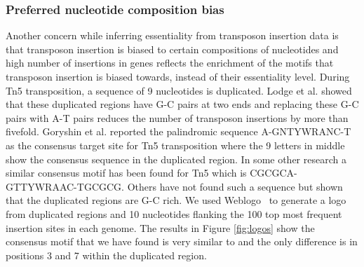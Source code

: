\documentclass[12pt,letterpaper]{article}
\begin{document}
\subsubsection{Preferred nucleotide composition bias}
Another concern while inferring essentiality from transposon insertion data is that transposon insertion is biased to certain compositions of nucleotides and high number of insertions in genes reflects the enrichment of the motifs that transposon insertion is biased towards, instead of their essentiality level. During Tn5 transposition, a sequence of 9 nucleotides is duplicated. Lodge et al. \cite{lodge_transposon_1988} showed that these duplicated regions have G-C pairs at two ends and replacing these G-C pairs with A-T pairs reduces the number of transposon insertions by more than fivefold. Goryshin et al. \cite{goryshin_tn5/is50_1998} reported the palindromic sequence A-GNTYWRANC-T as the consensus target site for Tn5 transposition where the 9 letters in middle show the consensus sequence in the duplicated region. %
In some other research a similar consensus motif has been found for Tn5 \cite{canals_high-throughput_2012} which is CGCGCA-GTTYWRAAC-TGCGCG. Others \cite{green_insertion_2012,rubin_essential_2015} have not found such a sequence but shown that the duplicated regions are G-C rich. We used Weblogo~\cite{crooks_weblogo:_2004} to generate a logo from duplicated regions and 10 nucleotides flanking the 100 top most frequent insertion sites in each genome. The results in Figure \ref{fig:logos} show the consensus motif that we have found is very similar to \cite{green_insertion_2012} and the only difference is in positions 3 and 7 within the duplicated region.

\end{document}
